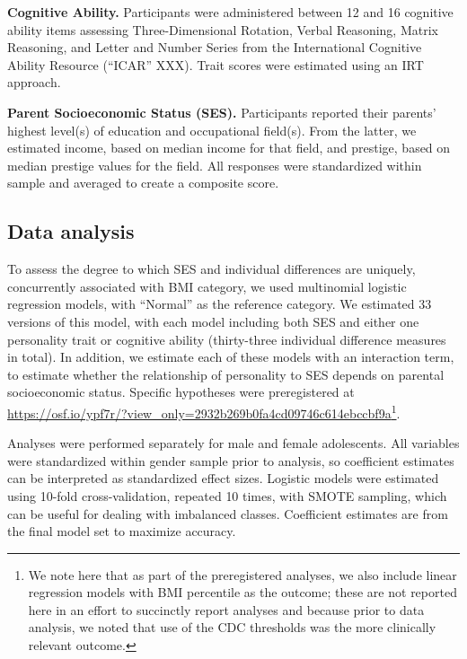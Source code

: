\documentclass[man]{apa6}
\begin{document}
\textbf{Cognitive Ability.} Participants were administered between 12 and 16 cognitive ability items assessing Three-Dimensional Rotation, Verbal Reasoning, Matrix Reasoning, and Letter and Number Series from the International Cognitive Ability Resource (\enquote{ICAR} XXX). Trait scores were estimated using an IRT approach.

\textbf{Parent Socioeconomic Status (SES).} Participants reported their parents' highest level(s) of education and occupational field(s). From the latter, we estimated income, based on median income for that field, and prestige, based on median prestige values for the field. All responses were standardized within sample and averaged to create a composite score.

\hypertarget{data-analysis}{%
\subsection{Data analysis}\label{data-analysis}}

To assess the degree to which SES and individual differences are uniquely, concurrently associated with BMI category, we used multinomial logistic regression models, with \enquote{Normal} as the reference category. We estimated 33 versions of this model, with each model including both SES and either one personality trait or cognitive ability (thirty-three individual difference measures in total). In addition, we estimate each of these models with an interaction term, to estimate whether the relationship of personality to SES depends on parental socioeconomic status. Specific hypotheses were preregistered at \url{https://osf.io/ypf7r/?view_only=2932b269b0fa4cd09746c614ebccbf9a}\footnote{We note here that as part of the preregistered analyses, we also include linear regression models with BMI percentile as the outcome; these are not reported here in an effort to succinctly report analyses and because prior to data analysis, we noted that use of the CDC thresholds was the more clinically relevant outcome.}.

Analyses were performed separately for male and female adolescents. All variables were standardized within gender sample prior to analysis, so coefficient estimates can be interpreted as standardized effect sizes. Logistic models were estimated using 10-fold cross-validation, repeated 10 times, with SMOTE sampling, which can be useful for dealing with imbalanced classes. Coefficient estimates are from the final model set to maximize accuracy.
\end{document}
